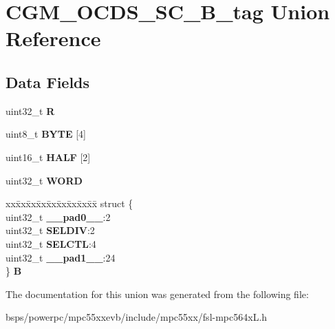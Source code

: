 \hypertarget{unionCGM__OCDS__SC__32B__tag}{}\section{C\+G\+M\+\_\+\+O\+C\+D\+S\+\_\+\+S\+C\+\_\+B\+\_\+tag Union Reference}
\label{unionCGM__OCDS__SC__32B__tag}
\subsection*{Data Fields}
\begin{DoxyCompactItemize}
\item 
\mbox{\label{unionCGM__OCDS__SC__32B__tag_ad2e0a7ddd9129945865d48145cd170d8}} 
uint32\+\_\+t {\bfseries R}
\item 
\mbox{\label{unionCGM__OCDS__SC__32B__tag_a31362af8c67b674ddfe746e6106f46c3}} 
uint8\+\_\+t {\bfseries B\+Y\+TE} \mbox{[}4\mbox{]}
\item 
\mbox{\label{unionCGM__OCDS__SC__32B__tag_a6c3d3bc1c6c1b8fa2383aa9706bba01e}} 
uint16\+\_\+t {\bfseries H\+A\+LF} \mbox{[}2\mbox{]}
\item 
\mbox{\label{unionCGM__OCDS__SC__32B__tag_a18aeb9565ca08ff71c5c5fd2f5821ae5}} 
uint32\+\_\+t {\bfseries W\+O\+RD}
\item 
\mbox{\label{unionCGM__OCDS__SC__32B__tag_aeb5f69eb83acff771dcef78a309477bb}} 
\begin{tabbing}
xx\=xx\=xx\=xx\=xx\=xx\=xx\=xx\=xx\=\kill
struct \{\\
\>uint32\_t {\bfseries \_\_pad0\_\_}:2\\
\>uint32\_t {\bfseries SELDIV}:2\\
\>uint32\_t {\bfseries SELCTL}:4\\
\>uint32\_t {\bfseries \_\_pad1\_\_}:24\\
\} {\bfseries B}\\

\end{tabbing}\end{DoxyCompactItemize}


The documentation for this union was generated from the following file\+:\begin{DoxyCompactItemize}
\item 
bsps/powerpc/mpc55xxevb/include/mpc55xx/fsl-\/mpc564x\+L.\+h\end{DoxyCompactItemize}
